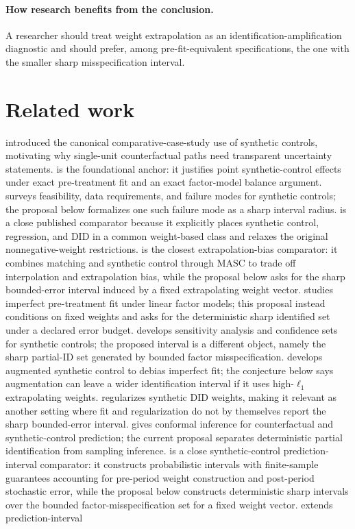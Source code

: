 \documentclass[11pt]{article}
\theoremstyle{definition}
\theoremstyle{plain}
\theoremstyle{remark}
\begin{document}
\paragraph{How research benefits from the conclusion.}
A researcher should treat weight extrapolation as an identification-amplification diagnostic and should prefer, among pre-fit-equivalent specifications, the one with the smaller sharp misspecification interval.

\section{Related work}
\citet{AbadieGardeazabal2003} introduced the canonical comparative-case-study use of synthetic controls, motivating why single-unit counterfactual paths need transparent uncertainty statements. \citet{AbadieDiamondHainmueller2010} is the foundational anchor: it justifies point synthetic-control effects under exact pre-treatment fit and an exact factor-model balance argument. \citet{Abadie2021} surveys feasibility, data requirements, and failure modes for synthetic controls; the proposal below formalizes one such failure mode as a sharp interval radius. \citet{DoudchenkoImbens2016} is a close published comparator because it explicitly places synthetic control, regression, and DID in a common weight-based class and relaxes the original nonnegative-weight restrictions. \citet{KelloggMogstadPouliotTorgovitsky2021} is the closest extrapolation-bias comparator: it combines matching and synthetic control through MASC to trade off interpolation and extrapolation bias, while the proposal below asks for the sharp bounded-error interval induced by a fixed extrapolating weight vector. \citet{FermanPinto2021} studies imperfect pre-treatment fit under linear factor models; this proposal instead conditions on fixed weights and asks for the deterministic sharp identified set under a declared error budget. \citet{FirpoPossebom2018} develops sensitivity analysis and confidence sets for synthetic controls; the proposed interval is a different object, namely the sharp partial-ID set generated by bounded factor misspecification. \citet{BenMichaelFellerRothstein2021} develops augmented synthetic control to debias imperfect fit; the conjecture below says augmentation can leave a wider identification interval if it uses high-\(\ell_1\) extrapolating weights. \citet{ArkhangelskyAtheyHirshbergImbensWager2021} regularizes synthetic DID weights, making it relevant as another setting where fit and regularization do not by themselves report the sharp bounded-error interval. \citet{ChernozhukovWuthrichZhu2021} gives conformal inference for counterfactual and synthetic-control prediction; the current proposal separates deterministic partial identification from sampling inference. \citet{CattaneoFengTitiunik2021} is a close synthetic-control prediction-interval comparator: it constructs probabilistic intervals with finite-sample guarantees accounting for pre-period weight construction and post-period stochastic error, while the proposal below constructs deterministic sharp intervals over the bounded factor-misspecification set for a fixed weight vector. \citet{CattaneoFengPalombaTitiunik2025RESTAT} extends prediction-interval 
\end{document}
